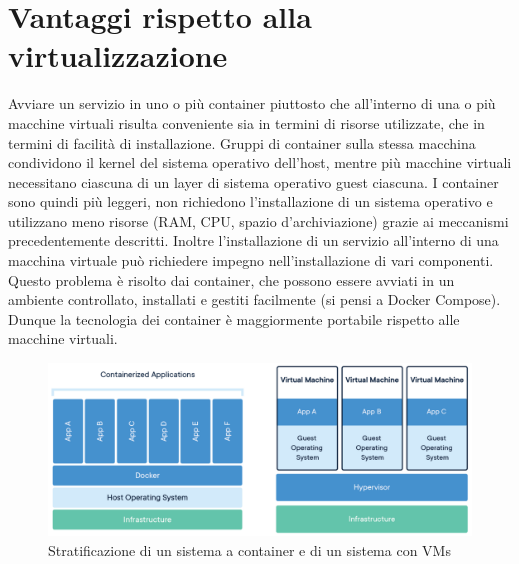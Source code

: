 \section{Vantaggi rispetto alla virtualizzazione}
Avviare un servizio in uno o più container piuttosto che all'interno di una o più macchine virtuali risulta conveniente sia in termini di risorse utilizzate, che in termini di facilità di installazione. Gruppi di container sulla stessa macchina condividono il kernel del sistema operativo dell'host, mentre più macchine virtuali necessitano ciascuna di un layer di sistema operativo guest ciascuna. I container sono quindi più leggeri, non richiedono l'installazione di un sistema operativo e utilizzano meno risorse (RAM, CPU, spazio d'archiviazione) grazie ai meccanismi precedentemente descritti. Inoltre l'installazione di un servizio all'interno di una macchina virtuale può richiedere impegno nell'installazione di vari componenti. Questo problema è risolto dai container, che possono essere avviati in un ambiente controllato, installati e gestiti facilmente (si pensi a Docker Compose). Dunque la tecnologia dei container è maggiormente portabile rispetto alle macchine virtuali.
\begin{figure}[h]
    \centering
    \includegraphics[scale=0.25]{immagini/docker-containerized-and-vm-transparent-bg.png}
    \caption{Stratificazione di un sistema a container e di un sistema con VMs}
    \label{fig:container-vs-VM}
\end{figure}